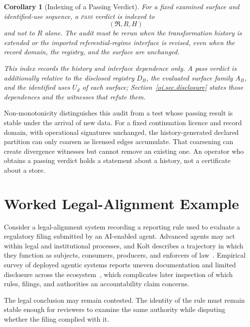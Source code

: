 \documentclass[11pt]{article}
\theoremstyle{plain}
\newtheorem{corollary}[theorem]{Corollary}
\theoremstyle{definition}
\theoremstyle{remark}
\newcommand{\PASS}{\textnormal{\textsc{pass}}}
\begin{document}
\begin{corollary}[Indexing of a Passing Verdict]
  \label{oi.cor.indexing}
  For a fixed examined surface and identified-use sequence,
  a \PASS{} verdict is indexed to
  \[
    (\mathfrak{R},R,H)
  \]
  and not to \(R\) alone.
  The audit must be rerun when the transformation history is extended
  or the imported referential-regime interface is revised,
  even when the record domain, the registry, and the surface are unchanged.

  This index records the history and interface dependence only.
  A pass verdict is additionally relative to
  the disclosed registry \(D_B\),
  the evaluated surface family \(A_B\),
  and the identified uses \(U_d\) of each surface;
  Section~\ref{oi.sec.disclosure} states those dependences
  and the witnesses that refute them.
\end{corollary}

Non-monotonicity distinguishes this audit from a test
whose passing result is stable under the arrival of new data.
For a fixed continuation licence and record domain,
with operational signatures unchanged, the
history-generated declared partition can only coarsen
as licensed edges accumulate.
That coarsening can create divergence witnesses
but cannot remove an existing one.
An operator who obtains a passing verdict
holds a statement about a history,
not a certificate about a store.

\section{Worked Legal-Alignment Example}
\label{oi.sec.worked}

Consider a legal-alignment system
recording a reporting rule used to evaluate
a regulatory filing submitted by an AI-enabled agent.
Advanced agents may act within legal and institutional processes,
and Kolt describes a trajectory in which they function as
subjects, consumers, producers, and enforcers of law~\citep{kolt2026superintelligence}.
Empirical survey of deployed agentic systems reports
uneven documentation and limited disclosure across the ecosystem~\citep{staufer2026agentindex},
which complicates later inspection
of which rules, filings, and authorities an accountability claim concerns.

The legal conclusion may remain contested.
The identity of the rule must remain stable enough
for reviewers to examine the same authority
while disputing whether the filing complied with it.
\end{document}
